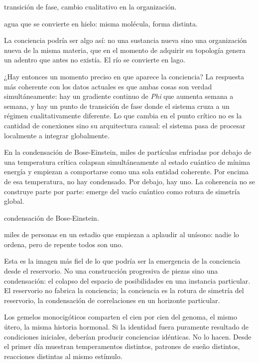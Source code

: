 \begin{fisica}
 transición de fase, cambio cualitativo en la organización.

 agua que se convierte en hielo: misma molécula, forma distinta.
\end{fisica}
La conciencia podría ser algo así: no una sustancia nueva sino una organización nueva de la misma materia, que en el momento de adquirir su topología genera un adentro que antes no existía. El río se convierte en lago.

¿Hay entonces un momento preciso en que aparece la conciencia? La respuesta más coherente con los datos actuales es que ambas cosas son verdad simultáneamente: hay un gradiente continuo de \emph{Phi} que aumenta semana a semana, y hay un punto de transición de fase donde el sistema cruza a un régimen cualitativamente diferente. Lo que cambia en el punto crítico no es la cantidad de conexiones sino su arquitectura causal: el sistema pasa de procesar localmente a integrar globalmente.

\noindent En la condensación de Bose-Einstein, miles de partículas enfriadas por debajo de una temperatura crítica colapsan simultáneamente al estado cuántico de mínima energía y empiezan a comportarse como una sola entidad coherente. Por encima de esa temperatura, no hay condensado. Por debajo, hay uno. La coherencia no se construye parte por parte: emerge del vacío cuántico como rotura de simetría global.

\begin{fisica}
 condensación de Bose-Einstein.

 miles de personas en un estadio que empiezan a aplaudir al unísono: nadie lo ordena, pero de repente todos son uno.
\end{fisica}
Esta es la imagen más fiel de lo que podría ser la emergencia de la conciencia desde el reservorio. No una construcción progresiva de piezas sino una condensación: el colapso del espacio de posibilidades en una instancia particular. El reservorio no fabrica la conciencia; la conciencia es la rotura de simetría del reservorio, la condensación de correlaciones en un horizonte particular.

Los gemelos monocigóticos comparten el cien por cien del genoma, el mismo útero, la misma historia hormonal. Si la identidad fuera puramente resultado de condiciones iniciales, deberían producir conciencias idénticas. No lo hacen. Desde el primer día muestran temperamentos distintos, patrones de sueño distintos, reacciones distintas al mismo estímulo.

